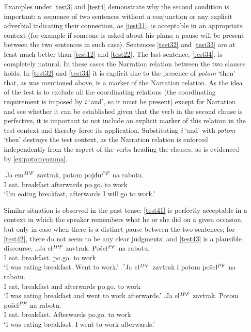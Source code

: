 Examples under \ref{test3} and \ref{test4} demonstrate why the second condition is important: a sequence of two sentences without a conjunction or any explicit adverbial indicating their connection, as \ref{test31}, is acceptable in an appropriate context (for example if someone is asked about his plans; a pause will be present between the two sentences in such case). Sentences \ref{test32} and \ref{test33} are at least much better than \ref{test12} and \ref{test22}. The last sentence, \ref{test34}, is completely natural. In these cases the Narration relation between the two clauses holds. In \ref{test32} and \ref{test34} it is explicit due to the presence of \textit{potom} `then' that, as was mentioned above, is a marker of the Narration relation. As the idea of the test is to exclude all the coordinating relations (the coordinating requirement is imposed by \textit{i} `and', so it must be present) except for Narration and see whether it can be established given that the verb in the second clause is perfective, it is important to not include an explicit marker of this relation in the test context and thereby force its application. Substituting  \textit{i} `and' with \textit{potom} `then' destroys the test context, as the Narration relation is enforced independently from the aspect of the verbs heading the clauses, as is evidenced by \ref{ex:potomcomma}.

\exg.\label{ex:potomcomma}Ja em$^{\mathit{IPF}}$ zavtrak, potom pojdu$^{\mathit{PF}}$ na rabotu.\\
I eat. breakfast afterwards po.go. to work\\
\vspace{0.5em}
`I'm eating breakfast, afterwards I will go to work.'

Similar situation is observed in the past tense: \ref{test41} is perfectly acceptable in a context in which the speaker remembers what he or she did on a given occasion, but only in case when there is a distinct pause between the two sentences; for \ref{test42}, there do not seem to be any clear judgments; and \ref{test43} is a plausible discourse.
\ex.\label{test4}\ag.\label{test41}Ja el$^{\mathit{IPF}}$ zavtrak. Po\v{s}el$^{\mathit{PF}}$ na rabotu.\\
I eat. breakfast. po.go. to work\\
\vspace{0.5em}
`I was eating breakfast. Went to work.'
\bg.\label{test42}$^?$Ja el$^{\mathit{IPF}}$ zavtrak i potom po\v{s}el$^{\mathit{PF}}$ na rabotu.\\
I eat. breakfast and afterwards po.go. to work\\
\vspace{0.5em}
`I was eating breakfast and went to work afterwards.'
\bg.\label{test43}Ja el$^{\mathit{IPF}}$ zavtrak. Potom po\v{s}el$^{\mathit{PF}}$ na rabotu.\\
I eat. breakfast. Afterwards po.go. to work\\
\vspace{0.5em}
`I was eating breakfast. I went to work afterwards.'

